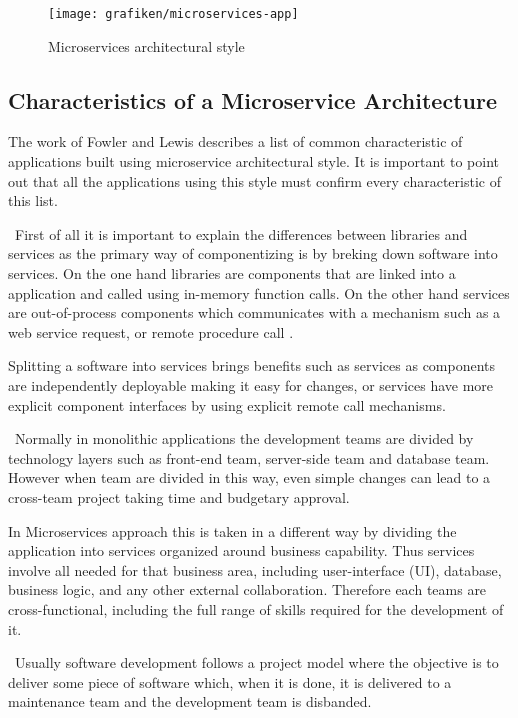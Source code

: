 \begin{figure}[H]
	\centering
    \texttt{[image: grafiken/microservices-app]}
    \caption{Microservices architectural style}
    \label{fig:microservices}
\end{figure}

\subsection{Characteristics of a Microservice Architecture}
The work of Fowler and Lewis \cite{Fowler2014} describes a list of common characteristic of applications built using microservice architectural style. It is important to point out that all the applications using this style must confirm every characteristic of this list.

\begin{description}[style=nextline]
\item[Componentization via Services] \hfill \
First of all it is important to explain the differences between libraries and services as the primary way of componentizing is by breking down software into services. On the one hand libraries are components that are linked into a application and called using in-memory function calls. On the other hand services are out-of-process components which communicates with a mechanism such as a web service request, or remote procedure call \cite{Fowler2014}.

Splitting a software into services brings benefits such as services as components are independently deployable making it easy for changes, or services have more explicit component interfaces by using explicit remote call mechanisms. 
\item[Organized around Business Capabilities] \hfill \
Normally in monolithic applications the development teams are divided by technology layers such as front-end team, server-side team and database team. However when team are divided in this way, even simple changes can lead to a cross-team project taking time and budgetary approval.

In Microservices approach this is taken in a different way by dividing the application into services organized around business capability. Thus services involve all needed for that business area, including user-interface (UI), database, business logic, and any other external collaboration. Therefore each teams are cross-functional, including the full range of skills required for the development of it.
\item[Products not Projects] \hfill \
Usually software development follows a project model where the objective is to deliver some piece of software which, when it is done, it is delivered to a maintenance team and the development team is disbanded.


\end{description}
